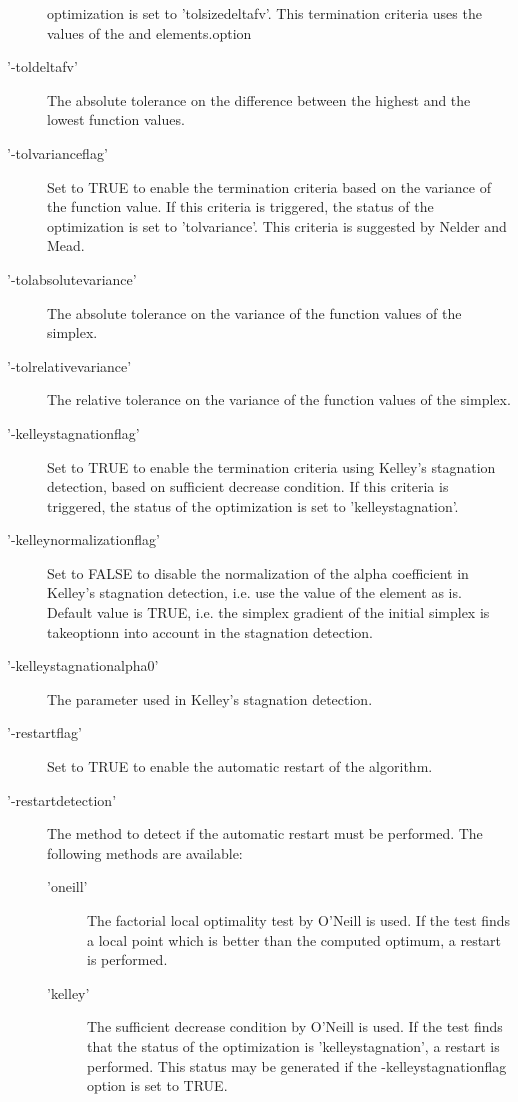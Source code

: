 \begin{Details}
\begin{description}
optimization is set to 'tolsizedeltafv'. This termination criteria uses
the values of the  and 
elements.option
\item['-toldeltafv'] The absolute tolerance on the difference between the
highest and the lowest function values.
\item['-tolvarianceflag'] Set to TRUE to enable the termination criteria
based on the variance of the function value. If this criteria is
triggered, the status of the optimization is set to 'tolvariance'.
This criteria is suggested by Nelder and Mead.
\item['-tolabsolutevariance'] The absolute tolerance on the variance of the
function values of the simplex.
\item['-tolrelativevariance'] The relative tolerance on the variance of the
function values of the simplex.
\item['-kelleystagnationflag'] Set to TRUE to enable the termination
criteria using Kelley's stagnation detection, based on sufficient decrease
condition. If this criteria is triggered, the status of the optimization
is set to 'kelleystagnation'.
\item['-kelleynormalizationflag'] Set to FALSE to disable the normalization
of the alpha coefficient in Kelley's stagnation detection, i.e. use the
value of the  element as is. Default value is
TRUE, i.e. the simplex gradient of the initial simplex is takeoptionn into
account in the stagnation detection.
\item['-kelleystagnationalpha0'] The parameter used in Kelley's stagnation
detection.
\item['-restartflag'] Set to TRUE to enable the automatic restart of the
algorithm.
\item['-restartdetection'] The method to detect if the automatic restart
must be performed. The following methods are available:\begin{description}

\item['oneill'] The factorial local optimality test by O'Neill is used. If
the test finds a local point which is better than the computed optimum,
a restart is performed.
\item['kelley'] The sufficient decrease condition by O'Neill is used. If
the test finds that the status of the optimization is
'kelleystagnation', a restart is performed. This status may be generated
if the -kelleystagnationflag option is set to TRUE.


\end{description}
\end{description}
\end{Details}
